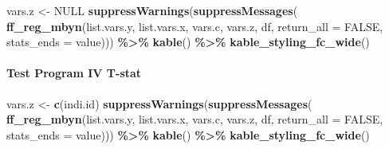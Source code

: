 \documentclass[
]{book}
\newenvironment{Shaded}{\begin{snugshade}}{\end{snugshade}}
\newcommand{\DataTypeTok}[1]{\textcolor[rgb]{0.13,0.29,0.53}{#1}}
\newcommand{\KeywordTok}[1]{\textcolor[rgb]{0.13,0.29,0.53}{\textbf{#1}}}
\newcommand{\NormalTok}[1]{#1}
\newcommand{\OperatorTok}[1]{\textcolor[rgb]{0.81,0.36,0.00}{\textbf{#1}}}
\newcommand{\OtherTok}[1]{\textcolor[rgb]{0.56,0.35,0.01}{#1}}
\newcommand{\StringTok}[1]{\textcolor[rgb]{0.31,0.60,0.02}{#1}}
\begin{document}
\begin{Shaded}
\begin{Highlighting}[]
\NormalTok{vars.z \textless{}{-}}\StringTok{ }\OtherTok{NULL}
\KeywordTok{suppressWarnings}\NormalTok{(}\KeywordTok{suppressMessages}\NormalTok{(}
  \KeywordTok{ff\_reg\_mbyn}\NormalTok{(list.vars.y, list.vars.x,}
\NormalTok{              vars.c, vars.z, df,}
              \DataTypeTok{return\_all =} \OtherTok{FALSE}\NormalTok{,}
              \DataTypeTok{stats\_ends =} \StringTok{\textquotesingle{}value\textquotesingle{}}\NormalTok{))) }\OperatorTok{\%\textgreater{}\%}
\StringTok{  }\KeywordTok{kable}\NormalTok{() }\OperatorTok{\%\textgreater{}\%}
\StringTok{  }\KeywordTok{kable\_styling\_fc\_wide}\NormalTok{()}
\end{Highlighting}
\end{Shaded}

\begin{table}[!h]
\centering
{}
\end{table}

\hypertarget{test-program-iv-t-stat}{%
\paragraph{Test Program IV T-stat}\label{test-program-iv-t-stat}}

\begin{Shaded}
\begin{Highlighting}[]
\NormalTok{vars.z \textless{}{-}}\StringTok{ }\KeywordTok{c}\NormalTok{(}\StringTok{\textquotesingle{}indi.id\textquotesingle{}}\NormalTok{)}
\KeywordTok{suppressWarnings}\NormalTok{(}\KeywordTok{suppressMessages}\NormalTok{(}
  \KeywordTok{ff\_reg\_mbyn}\NormalTok{(list.vars.y, list.vars.x,}
\NormalTok{              vars.c, vars.z, df,}
              \DataTypeTok{return\_all =} \OtherTok{FALSE}\NormalTok{,}
              \DataTypeTok{stats\_ends =} \StringTok{\textquotesingle{}value\textquotesingle{}}\NormalTok{))) }\OperatorTok{\%\textgreater{}\%}
\StringTok{  }\KeywordTok{kable}\NormalTok{() }\OperatorTok{\%\textgreater{}\%}
\StringTok{  }\KeywordTok{kable\_styling\_fc\_wide}\NormalTok{()}
\end{Highlighting}
\end{Shaded}
\end{document}

